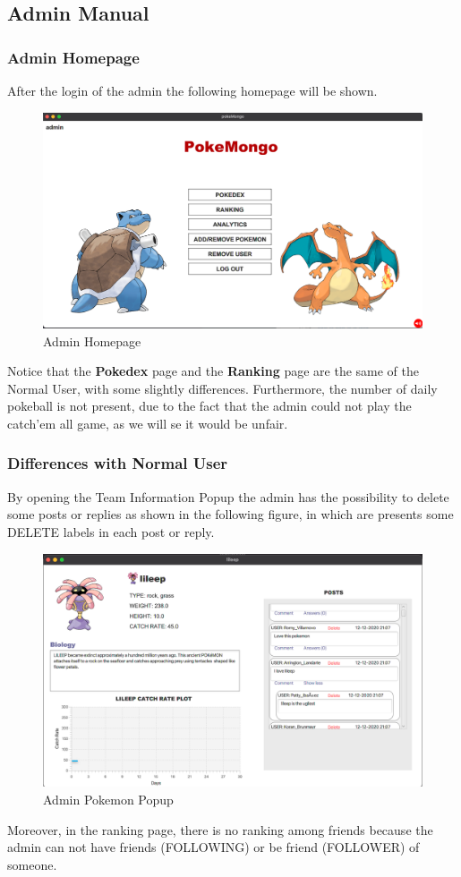 \subsection{Admin Manual}
\subsubsection{Admin Homepage}
After the login of the admin the following homepage will be shown.
\begin{figure}[H]
	\centering
	\includegraphics[width=\textwidth]{img/userManual/admin_homepage.png}
	\caption{Admin Homepage}
\end{figure}
Notice that the \textbf{Pokedex} page and the \textbf{Ranking} page are the same of the Normal User, with some slightly differences. Furthermore, the number of daily pokeball is not present, due to the fact that the admin could not play the catch'em all game, as we will se it would be unfair.
\subsubsection{Differences with Normal User}
By opening the Team Information Popup the admin has the possibility to delete some posts or replies as shown in the following figure, in which are presents some DELETE labels in each post or reply.
\begin{figure}[H]
	\centering
	\includegraphics[width=\textwidth]{img/userManual/admin_pokemon_window.png}
	\caption{Admin Pokemon Popup}
\end{figure}
Moreover, in the ranking page, there is no ranking among friends because the admin can not have friends (FOLLOWING) or be friend (FOLLOWER) of someone.

